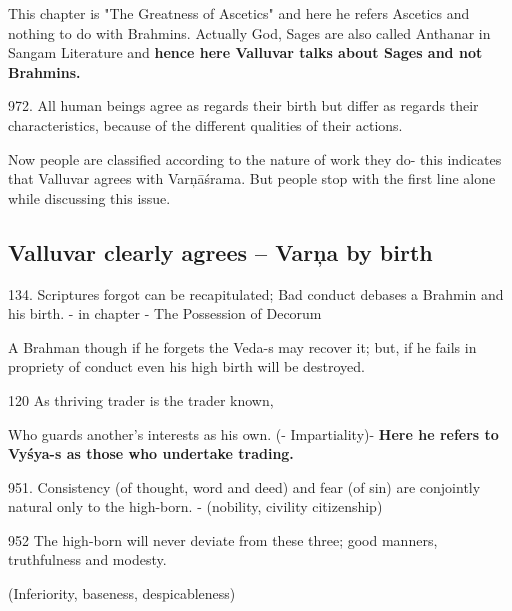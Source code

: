 This chapter is "The Greatness of Ascetics" and here he refers Ascetics and nothing to do with Brahmins. Actually God, Sages are also called Anthanar in Sangam Literature and \textbf{hence here Valluvar talks about Sages and not Brahmins.}

 972. All human beings agree as regards their birth but differ as regards their characteristics, because of the different qualities of their actions.

Now people are classified according to the nature of work they do- this indicates that Valluvar agrees with Varņāśrama. But people stop with the first line alone while discussing this issue.


\subsection*{Valluvar clearly agrees – Varņa by birth}

134. Scriptures forgot can be recapitulated; Bad conduct debases a Brahmin and his birth. - in chapter - The Possession of Decorum

A Brahman though if he forgets the Veda-s may recover it; but, if he fails in propriety of conduct even his high birth will be destroyed.

120 As thriving trader is the trader known,

\newpage

Who guards another's interests as his own. (- Impartiality)- \textbf{Here he refers to Vyśya-s as those who undertake trading.}

951. Consistency (of thought, word and deed) and fear (of sin) are conjointly natural only to the high-born. -  (nobility, civility citizenship)

952 The high-born will never deviate from these three; good manners, truthfulness and modesty. 

 (Inferiority, baseness, despicableness)

